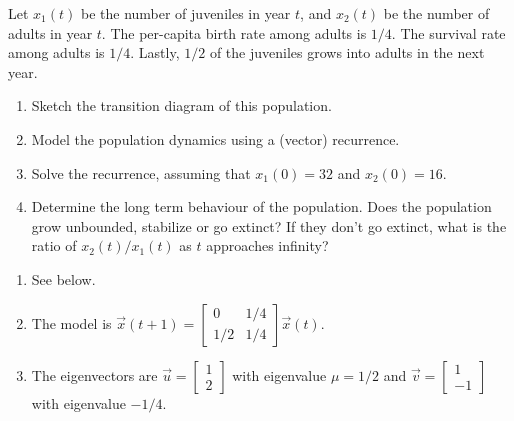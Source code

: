 \documentclass[../main.tex]{subfiles}
\begin{document}
\begin{exercise}
  Let \(x_{1}(t)\) be the number of juveniles in year \(t\), and \(x_{2}(t)\) be the number of adults in year \(t\).  The per-capita birth rate among adults is \(1/4\). The survival rate among adults is \(1/4\). Lastly, \(1/2\) of the juveniles grows into adults in the next year. 

  \begin{enumerate}
    \item Sketch the transition diagram of this population.
    \item Model the population dynamics using a (vector) recurrence.
    \item Solve the recurrence, assuming that \(x_{1}(0) = 32\) and \(x_{2}(0) = 16\).
    \item Determine the long term behaviour of the population. Does the population grow unbounded, stabilize or go extinct? If they don't go extinct, what is the ratio of \(x_{2}(t) / x_{1}(t)\) as \(t\) approaches infinity?
  \end{enumerate}

  \begin{solution} \phantom{top}

    \begin{enumerate}
      \item See below. 


      \item The model is \(\vec{x}(t+1) = \begin{bmatrix} 0 & 1/4 \\ 1/2 & 1/4 \end{bmatrix} \vec{x}(t)\).
      \item The eigenvectors are \(\vec{u} = \begin{bmatrix} 1 \\2 \end{bmatrix}\) with eigenvalue \(\mu = 1/2\) and \(\vec{v} = \begin{bmatrix} 1 \\ -1 \end{bmatrix}\) with eigenvalue \(-1/4\).


\end{enumerate}
\end{solution}
\end{exercise}
\end{document}
